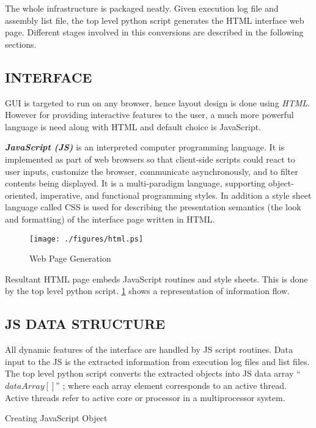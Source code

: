 The whole infrastructure is packaged neatly. Given execution log file and assembly list file, the top level python script generates the HTML interface web page. Different stages involved in this conversions are described in the following sections. 

\subsection {INTERFACE}
GUI is targeted to run on any browser, hence layout design is done using {\it HTML}. However for providing interactive features to the user, a much more powerful language is need along with HTML and default choice is JavaScript.

\emph {\bf JavaScript (JS)} is an interpreted computer programming language. It is  implemented as part of web browsers so that client-side scripts could react to user inputs, customize the browser, communicate asynchronously, and to filter contents being displayed. It is a multi-paradigm language, supporting object-oriented, imperative, and functional programming styles.  
In addition a style sheet language called CSS is used for describing the presentation semantics (the look and formatting) of the interface page written in HTML.

\begin{figure}[h]
\centering
\texttt{[image: ./figures/html.ps]}
\caption{Web Page Generation}
\label{fig:html.ps}
\end{figure}

Resultant HTML page embeds JavaScript routines and style sheets. This is done by the top level python script. \figurename{\ref{fig:html.ps}} shows a representation of information flow.


\subsection{JS DATA STRUCTURE}
All dynamic features of the interface are handled by JS script routines. Data input to the JS is the extracted information from execution log files and list files. The top level python script converts the extracted objects into JS data array ``$dataArray[]$'' ; where each array element corresponds to an active thread. Active threads refer to active core or processor in a multiprocessor system.  

\IncMargin{1em}
\begin{algorithm}[h]
\DontPrintSemicolon
{} 
\KwFn {}
\BlankLine
{}
\caption{Creating JavaScript Object}
\end{algorithm}\DecMargin{1em}



